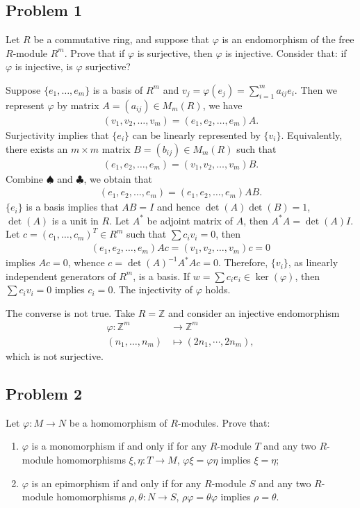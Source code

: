 \subsection*{Problem 1}
Let $R$ be a commutative ring, and suppose that $\varphi$ is an endomorphism of the free $R$-module $R^m$. Prove that if $\varphi$ is surjective, then $\varphi$ is injective. Consider that: if $\varphi$ is injective, is $\varphi$ surjective?
\begin{solution}
Suppose $\{e_1,\dots,e_m\}$ is a basis of $R^m$ and $v_j=\varphi(e_j) = \sum_{i=1}^m a_{ij} e_i$. Then
we represent $\varphi$ by matrix $A = (a_{ij}) \in M_m(R)$, we have 
\begin{align*}
(v_1,v_2,\dots,v_m) = (e_1,e_2,\dots,e_m) A. \tag{$\clubsuit$}
\end{align*}
Surjectivity implies that $\{e_i\}$ can be linearly represented by $\{v_i\}$. Equivalently, there exists an $m\times m$ matrix $B=(b_{ij})\in M_m(R)$ such that
\begin{align*}
    (e_1,e_2,\dots,e_m) = (v_1,v_2,\dots,v_m)B. \tag{$\spadesuit$}
\end{align*} 
Combine $\spadesuit$ and $\clubsuit$, we obtain that 
\begin{align*}
     (e_1,e_2,\dots,e_m)= (e_1,e_2,\dots,e_m)AB.
\end{align*}
$\{e_i\}$ is a basis implies that $AB=I$ and hence $\det(A)\det(B)=1$, $\det(A)$ is a unit in $R$. Let $A^*$ be adjoint matrix of $A$, then $A^*A=\det(A)I$. 
Let $c=(c_1,\dots,c_m)^T\in R^m$ such that $\sum c_iv_i=0$, then 
\begin{align*}
    (e_1,e_2,\dots,e_m) Ac = (v_1,v_2,\dots,v_m)c =0
\end{align*}  
implies $Ac=0$, whence $c=\det(A)^{-1}A^*Ac=0$. Therefore, $\{v_i\}$, as linearly independent generators of $R^m$, is a basis.  If $w=\sum c_ie_i\in\ker(\varphi)$, then 
$\sum c_iv_i=0$ implies $c_i=0$. The injectivity of $\varphi$ holds.

The converse is not true. Take $R=\mathbb{Z}$ and consider an injective endomorphism
\begin{align*}
    \varphi:\mathbb{Z}^m &\to \mathbb{Z}^m\\
    (n_1,\dots,n_m) &\mapsto (2n_1,\cdots,2n_m),
\end{align*}
which is not surjective.
\end{solution}


\subsection*{Problem 2}
Let $\varphi : M \to N$ be a homomorphism of $R$-modules. Prove that:
\begin{enumerate}
    \item $\varphi$ is a monomorphism if and only if for any $R$-module $T$ and any two $R$-module homomorphisms $\xi, \eta : T \to M$, $\varphi\xi = \varphi\eta$ implies $\xi = \eta$;
    \item $\varphi$ is an epimorphism if and only if for any $R$-module $S$ and any two $R$-module homomorphisms $\rho, \theta : N \to S$, $\rho\varphi = \theta\varphi$ implies $\rho = \theta$.
\end{enumerate}

